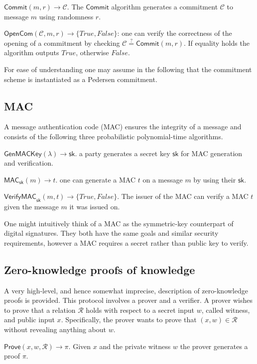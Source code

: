 \documentclass{article}
\begin{document}
\noindent$\mathsf{Commit}(m,r)\xrightarrow{}\mathcal{C}$. The $\mathsf{Commit}$ algorithm generates a commitment $\mathcal{C}$ to message $m$ using randomness $r$.

\noindent$\mathsf{OpenCom}(\mathcal{C},m,r)\xrightarrow{}\{\mathit{True},\mathit{False}\}$: one can verify the correctness of the opening of a commitment by checking $\mathcal{C}\stackrel{?}{=}\mathsf{Commit}(m,r)$. If equality holds the algorithm outputs $\mathit{True}$, otherwise $\mathit{False}$.

For ease of understanding one may assume in the following that the commitment scheme is instantiated as a Pedersen commitment.

\subsection{MAC}
A message authentication code (MAC) ensures the integrity of a message and consists of the following three probabilistic polynomial-time algorithms.

\noindent$\mathsf{GenMACKey}(\lambda)\xrightarrow{}{\mathsf{sk}}$. a party generates a secret key $\mathsf{sk}$ for MAC generation and verification.

\noindent$\mathsf{MAC}_{\mathsf{sk}}(m)\xrightarrow{}t$. one can generate a MAC $t$ on a message $m$ by using their $\mathsf{sk}$.

\noindent$\mathsf{VerifyMAC}_{\mathsf{sk}}(m,t)\xrightarrow{}\{\mathit{True},\mathit{False}\}$. The issuer of the MAC can verify a MAC $t$ given the message $m$ it was issued on.

One might intuitively think of a MAC as the symmetric-key counterpart of digital signatures. They both have the same goals and similar security requirements, however a MAC requires a secret rather than public key to verify.

\subsection{Zero-knowledge proofs of knowledge}
A very high-level, and hence somewhat imprecise, description of zero-knowledge proofs is provided. This protocol involves a prover and a verifier. A prover wishes to prove that a relation $\mathcal{R}$ holds with respect to a secret input $w$, called witness, and public input $x$. Specifically, the prover wants to prove that $(x, w) \in \mathcal{R}$ without revealing anything about $w$.

\noindent$\mathsf{Prove}(x,w,\mathcal{R})\xrightarrow{}\pi$. Given $x$ and the private witness $w$ the prover generates a proof $\pi$.
\end{document}
